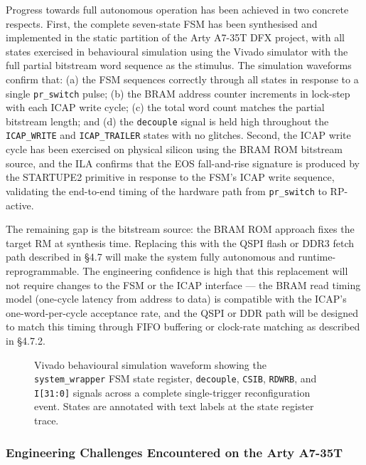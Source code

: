 Progress towards full autonomous operation has been achieved in two concrete respects. First, the complete seven-state FSM has been synthesised and implemented in the static partition of the Arty A7-35T DFX project, with all states exercised in behavioural simulation using the Vivado simulator with the full partial bitstream word sequence as the stimulus. The simulation waveforms confirm that: (a) the FSM sequences correctly through all states in response to a single \texttt{pr\_switch} pulse; (b) the BRAM address counter increments in lock-step with each ICAP write cycle; (c) the total word count matches the partial bitstream length; and (d) the \texttt{decouple} signal is held high throughout the \texttt{ICAP\_WRITE} and \texttt{ICAP\_TRAILER} states with no glitches. Second, the ICAP write cycle has been exercised on physical silicon using the BRAM ROM bitstream source, and the ILA confirms that the EOS fall-and-rise signature is produced by the STARTUPE2 primitive in response to the FSM's ICAP write sequence, validating the end-to-end timing of the hardware path from \texttt{pr\_switch} to RP-active.

The remaining gap is the bitstream source: the BRAM ROM approach fixes the target RM at synthesis time. Replacing this with the QSPI flash or DDR3 fetch path described in §4.7 will make the system fully autonomous and runtime-reprogrammable. The engineering confidence is high that this replacement will not require changes to the FSM or the ICAP interface — the BRAM read timing model (one-cycle latency from address to data) is compatible with the ICAP's one-word-per-cycle acceptance rate, and the QSPI or DDR path will be designed to match this timing through FIFO buffering or clock-rate matching as described in §4.7.2.

\begin{figure}[htbp]
\centering
{}
\caption{Vivado behavioural simulation waveform showing the \texttt{system\_wrapper} FSM state register, \texttt{decouple}, \texttt{CSIB}, \texttt{RDWRB}, and \texttt{I[31:0]} signals across a complete single-trigger reconfiguration event. States are annotated with text labels at the state register trace.}
\end{figure}

\subsubsection{Engineering Challenges Encountered on the Arty A7-35T}

